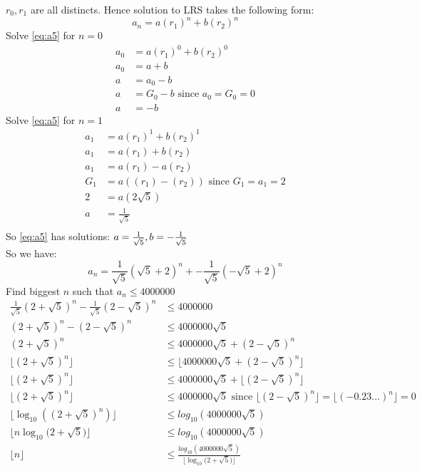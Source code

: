 \documentclass[12pt]{report}
\begin{document}
\(r_0, r_1\) are all distincts.
Hence solution to LRS takes the following form:
\begin{equation} \label{eq:a5}
 a_n = a(r_1)^n + b(r_2)^n 
\end{equation} 
Solve \eqref{eq:a5}  for \(n=0\)
\begin{equation} 
\begin{aligned}
   a_0 &= a(r_1)^0 + b(r_2)^0  \\
   a_0 &= a + b  \\
   a &= a_0 - b   \\
   a &= G_0 - b \text{ since } a_0 = G_0 = 0 \\
   a &= -b
\end{aligned}
\end{equation} 
Solve \eqref{eq:a5}  for \(n=1\)
\begin{equation} 
\begin{aligned}
   a_1 &= a(r_1)^1 + b(r_2)^1  \\
   a_1 &= a(r_1) + b(r_2)  \\
   a_1 &= a(r_1) - a(r_2)   \\
   G_1 &= a ((r_1) - (r_2)) \text{ since } G_1 = a_1 = 2 \\
   2 &= a (2\sqrt{5} )\\
   a &= \frac{1}{\sqrt{5}}\\
\end{aligned}
\end{equation}     
So \eqref{eq:a5} has solutions:     
\(a = \frac{1}{\sqrt{5}}, b = -\frac{1}{\sqrt{5}}   \\
\) \\
So we have:
\begin{equation} \label{eq:a6}
 a_n = \frac{1}{\sqrt{5}}(\sqrt{5} + 2)^n + -\frac{1}{\sqrt{5}}(-\sqrt{5} + 2)^n 
\end{equation} 
Find biggest \(n\) such that \(a_n \leq 4000000 \) 
\begin{equation}
\begin{aligned} \label{eq:a7}
\frac{1}{\sqrt{5}}(2+\sqrt{5})^n - \frac{1}{\sqrt{5}}(2-\sqrt{5})^n &\leq 4000000 \\
(2+\sqrt{5})^n - (2 - \sqrt{5})^n &\leq 4000000\sqrt{5} \\
(2+\sqrt{5})^n  &\leq 4000000\sqrt{5} + (2 - \sqrt{5})^n\\
\lfloor (2+\sqrt{5})^n \rfloor &\leq \lfloor 4000000\sqrt{5} + (2 - \sqrt{5})^n \rfloor \\
\lfloor (2+\sqrt{5})^n \rfloor &\leq  4000000\sqrt{5} + \lfloor (2 - \sqrt{5})^n \rfloor \\
\lfloor (2+\sqrt{5})^n \rfloor &\leq  4000000\sqrt{5} \text{ since }  \lfloor (2 - \sqrt{5})^n \rfloor = \lfloor (-0.23...)^n \rfloor  = 0\\ 
\lfloor \log_{10}({(2+\sqrt{5})^n}) \rfloor &\leq log_{10}({4000000\sqrt{5}}) \\
\lfloor n \log_{10}{(2+\sqrt{5}}) \rfloor &\leq log_{10}({4000000\sqrt{5}}) \\
\lfloor n \rfloor &\leq \frac{log_{10}({4000000\sqrt{5}})}{\lfloor \log_{10}{(2+\sqrt{5}}) \rfloor} \\
\end{aligned}
\end{equation}
\end{document}
